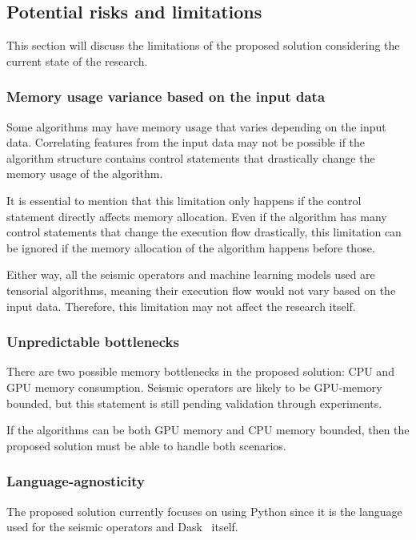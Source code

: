 \subsection{Potential risks and limitations}
\label{subsec:potential-risks-and-limitations}

This section will discuss the limitations of the proposed solution considering the current state of the research.

\subsubsection{Memory usage variance based on the input data}

Some algorithms may have memory usage that varies depending on the input data.
Correlating features from the input data may not be possible if the algorithm structure contains control statements that drastically change the memory usage of the algorithm.

It is essential to mention that this limitation only happens if the control statement directly affects memory allocation.
Even if the algorithm has many control statements that change the execution flow drastically, this limitation can be ignored if the memory allocation of the algorithm happens before those. 

Either way, all the seismic operators and machine learning models used are tensorial algorithms, meaning their execution flow would not vary based on the input data.
Therefore, this limitation may not affect the research itself.

\subsubsection{Unpredictable bottlenecks}

There are two possible memory bottlenecks in the proposed solution: \ac{CPU} and \ac{GPU} memory consumption.
Seismic operators are likely to be \ac{GPU}-memory bounded, but this statement is still pending validation through experiments.

If the algorithms can be both \ac{GPU} memory and \ac{CPU} memory bounded, then the proposed solution must be able to handle both scenarios.

\subsubsection{Language-agnosticity}

The proposed solution currently focuses on using Python since it is the language used for the seismic operators and Dask~\cite{dask} itself.

